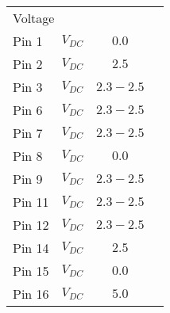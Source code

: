 \documentclass{article}[12pt]
\newcommand{\measline}{\underline{\hspace{0.75in}}}
\begin{document}
\begin{longtable}{lccc}
\multicolumn{4}{l}{\hspace{0.25in}Voltage} \\
\hspace{0.5in}Pin 1 & $V_{DC}$ & $0.0$ & \measline \\
\hspace{0.5in}Pin 2 & $V_{DC}$ & $2.5$ & \measline \\
\hspace{0.5in}Pin 3 & $V_{DC}$ & $2.3-2.5$ & \measline \\
\hspace{0.5in}Pin 6 & $V_{DC}$ & $2.3-2.5$ & \measline \\
\hspace{0.5in}Pin 7 & $V_{DC}$ & $2.3-2.5$ & \measline \\
\hspace{0.5in}Pin 8 & $V_{DC}$ & $0.0$ & \measline \\
\hspace{0.5in}Pin 9 & $V_{DC}$ & $2.3-2.5$ & \measline \\
\hspace{0.5in}Pin 11 & $V_{DC}$ & $2.3-2.5$ & \measline \\
\hspace{0.5in}Pin 12 & $V_{DC}$ & $2.3-2.5$ & \measline \\
\hspace{0.5in}Pin 14 & $V_{DC}$ & $2.5$ & \measline \\
\hspace{0.5in}Pin 15 & $V_{DC}$ & $0.0$ & \measline \\
\hspace{0.5in}Pin 16 & $V_{DC}$ & $5.0$ & \measline \\
\hline
\end{longtable}
\end{document}
